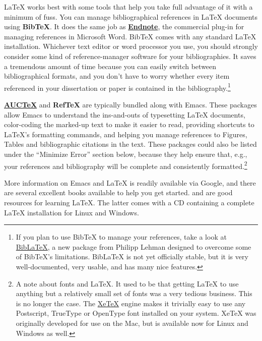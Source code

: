 \documentclass[11pt,article,oneside]{memoir}
\begin{document}
LaTeX works best with some tools that help you take full advantage of it with a minimum of fuss. You can manage bibliographical references in LaTeX documents using \textbf{BibTeX}. It does the same job as \href{http://www.endnote.com/}{\textbf{Endnote}}, the commercial plug-in for managing references in Microsoft Word. BibTeX comes with any standard LaTeX installation. Whichever text editor or word processor you use, you should strongly consider some kind of reference-manager software for your bibliographies. It saves a tremendous amount of time because you can easily switch between bibliographical formats, and you don't have to worry whether every item referenced in your dissertation or paper is contained in the bibliography.\footnote{If you plan to use BibTeX to manage your references, take a look at  \href{http://www.ctan.org/tex-archive/help/Catalogue/entries/biblatex.html}{BibLaTeX}, a new package from Philipp Lehman designed to overcome some of BibTeX's limitations. BibLaTeX is not yet officially stable, but it is very well-documented, very usable, and has many nice features.}    

\textbf{\href{http://www.gnu.org/software/auctex/}{AUCTeX}} and \textbf{RefTeX} are typically bundled along with Emacs. These packages allow Emacs to understand the ins-and-outs of typesetting LaTeX documents, color-coding the marked-up text to make it easier to read, providing shortcuts to LaTeX's formatting commands, and helping you manage references to Figures, Tables and bibliographic citations in the text. These packages could also be listed under the ``Minimize Error'' section below, because they help ensure that, e.g., your references and bibliography will be complete and consistently formatted.\footnote{A note about fonts and LaTeX. It used to be that getting LaTeX to use anything but a relatively small set of fonts was a very tedious business. This is no longer the case. The \href{http://scripts.sil.org/cms/scripts/page.php?site_id=nrsi&id=xetex}{XeTeX} engine makes it trivially easy to use any Postscript, TrueType or OpenType font installed on your system. XeTeX was originally developed for use on the Mac, but is available now for Linux and Windows as well.} 

More information on Emacs and LaTeX is readily available via Google, and there are several excellent books available to help you get started. \citet{kopka03:_guide_latex} and \citet{mittlebach04:_latex_compan} are good resources for learning LaTeX. The latter comes with a CD containing a complete LaTeX installation for Linux and Windows. 
     
\end{document}
